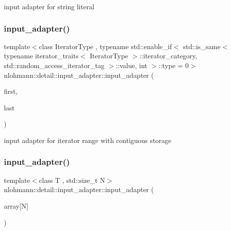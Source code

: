input adapter for string literal 

\mbox{\label{classnlohmann_1_1detail_1_1input__adapter_ad6824b0f792691f75186c527fa31a6b4}} 
\subsubsection{\texorpdfstring{input\+\_\+adapter()}{input\_adapter()}\hspace{0.1cm}{\footnotesize\ttfamily [9/11]}}
{\footnotesize\ttfamily template$<$class Iterator\+Type , typename std\+::enable\+\_\+if$<$ std\+::is\+\_\+same$<$ typename iterator\+\_\+traits$<$ Iterator\+Type $>$\+::iterator\+\_\+category, std\+::random\+\_\+access\+\_\+iterator\+\_\+tag $>$\+::value, int $>$\+::type  = 0$>$ \\
nlohmann\+::detail\+::input\+\_\+adapter\+::input\+\_\+adapter (\begin{DoxyParamCaption}\item[{Iterator\+Type}]{first,  }\item[{Iterator\+Type}]{last }\end{DoxyParamCaption})\hspace{0.3cm}{\ttfamily [inline]}}



input adapter for iterator range with contiguous storage 

\mbox{\label{classnlohmann_1_1detail_1_1input__adapter_aa2392138bf8307df1994dc7eb22d51ce}} 
\subsubsection{\texorpdfstring{input\+\_\+adapter()}{input\_adapter()}\hspace{0.1cm}{\footnotesize\ttfamily [10/11]}}
{\footnotesize\ttfamily template$<$class T , std\+::size\+\_\+t N$>$ \\
nlohmann\+::detail\+::input\+\_\+adapter\+::input\+\_\+adapter (\begin{DoxyParamCaption}\item[{T(\&)}]{array\mbox{[}\+N\mbox{]} }\end{DoxyParamCaption})\hspace{0.3cm}{\ttfamily [inline]}}



